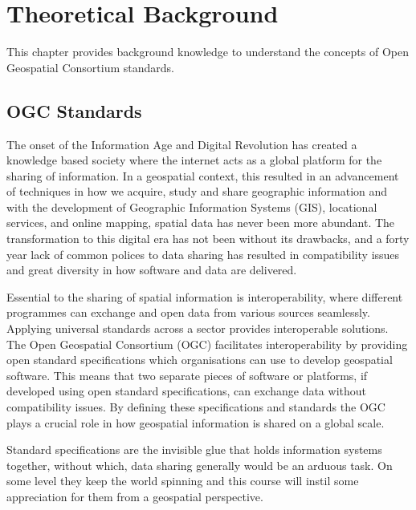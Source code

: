 \documentclass[class=scrbook, crop=false]{standalone}
\begin{document}
\ifstandalone

    
\fi

\chapter{Theoretical Background}
\label{Chapter::Theoretical_Background} %
This chapter provides background knowledge to understand the concepts of Open Geospatial Consortium standards.

\section{OGC Standards}
\label{Section::OGC Standards}

The onset of the Information Age and Digital Revolution has created a knowledge based society where the internet acts as a global platform for the sharing of information. In a geospatial context, this resulted in an advancement of techniques in how we acquire, study and share geographic information and with the development of Geographic Information Systems (GIS), locational services, and online mapping, spatial data has never been more abundant. The transformation to this digital era has not been without its drawbacks, and a forty year lack of common polices to data sharing has resulted in compatibility issues and great diversity in how software and data are delivered.

Essential to the sharing of spatial information is interoperability, where different programmes can exchange and open data from various sources seamlessly. Applying universal standards across a sector provides interoperable solutions. The Open Geospatial Consortium (OGC) facilitates interoperability by providing open standard specifications which organisations can use to develop geospatial software. This means that two separate pieces of software or platforms, if developed using open standard specifications, can exchange data without compatibility issues. By defining these specifications and standards the OGC plays a crucial role in how geospatial information is shared on a global scale.

Standard specifications are the invisible glue that holds information systems together, without which, data sharing generally would be an arduous task. On some level they keep the world spinning and this course will instil some appreciation for them from a geospatial perspective.
\end{document}
